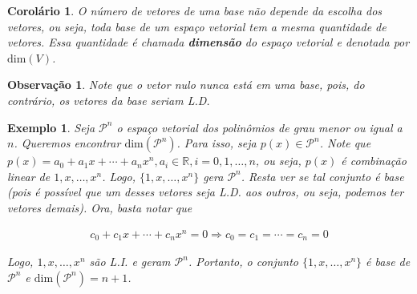 \documentclass{article}
\newtheorem{corollary}{Corolário}[theorem]
\newtheorem*{remark}{Observação}
\newtheorem*{example}{Exemplo}
\begin{document}
\begin{corollary}
	O número de vetores de uma base não depende da escolha dos vetores, ou seja, toda base de um espaço vetorial tem a mesma quantidade de vetores. Essa quantidade é chamada \textbf{dimensão} do espaço vetorial e denotada por $\text{dim}(V)$.
\end{corollary}

\begin{remark}
	Note que o vetor nulo nunca está em uma base, pois, do contrário, os vetores da base seriam L.D.
\end{remark}

\begin{example}
	Seja $\mathcal{P}^n$ o espaço vetorial dos polinômios de grau menor ou igual a $n$. Queremos encontrar $\text{dim}(\mathcal{P}^n)$. Para isso, seja $p(x)\in\mathcal{P}^n$. Note que $p(x) = a_0 + a_1x + \cdots + a_nx^n, a_i\in\mathbb{R}, i=0,1,\dots,n$, ou seja, $p(x)$ é combinação linear de $1, x, \dots, x^n$. Logo, $\{1, x, \dots, x^n\}$ gera $\mathcal{P}^n$. Resta ver se tal conjunto é base (pois é possível que um desses vetores seja L.D. aos outros, ou seja, podemos ter vetores demais). Ora, basta notar que
	
	\begin{align*}
	c_0 + c_1x + \cdots + c_nx^n = 0 \Rightarrow c_0 = c_1 = \cdots = c_n = 0
	\end{align*}
	
	\par\vspace{0.3cm} Logo, $1, x, \dots, x^n$ são L.I. e geram $\mathcal{P}^n$. Portanto, o conjunto $\{1, x, \dots, x^n\}$ é base de $\mathcal{P}^n$ e $\text{dim}(\mathcal{P}^n) = n+1$.
\end{example}
\end{document}
